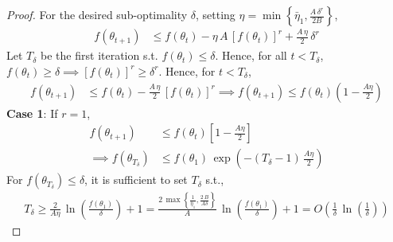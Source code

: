 \documentclass[10pt,a4paper]{amsart}
\newcommand{\tht}{\theta_t}
\newcommand{\thtt}{\theta_{t+1}}
\begin{document}
\begin{proof}
For the desired sub-optimality $\delta$, setting $\eta = \min\left\{\bar{\eta}_1, \frac{A \, \delta^{r}}{2B} \right\}$,
\begin{align*}
f(\thtt) & \leq f(\tht) - \eta \, A \, [f(\tht)]^r + \frac{A \, \eta}{2} \, \delta^r    
\end{align*}
Let $T_\delta$ be the first iteration s.t. $f(\tht) \leq \delta$. Hence, for all $t < T_\delta$, $f(\tht) \geq \delta \implies [f(\tht)]^{r} \geq \delta^r$. Hence, for $t < T_\delta$, 
\begin{align}
f(\thtt) & \leq f(\tht) - \frac{A \, \eta}{2} \,  [f(\tht)]^r \implies f(\thtt) \leq f(\tht)\left(1-\frac{A\eta}{2}\right)
\label{eq:lemma-p2-sd-inter-1}
\end{align}
\textbf{Case 1}: If $r = 1$, 
\begin{align*}
f(\thtt) & \leq f(\tht) \left[1 - \frac{A \eta}{2} \right] \\
\implies f(\theta_{T_\delta}) & \leq f(\theta_1) \, \exp\left(-(T_\delta-1) \, \frac{A \eta}{2}\right)
\end{align*}
For $f(\theta_{T_\delta}) \leq \delta$, it is sufficient to set $T_\delta$ s.t., 
\begin{align*}    
T_\delta \geq \frac{2}{A \eta} \, \ln\left(\frac{f(\theta_1)}{\delta}\right) + 1 = \frac{2 \, \max\left\{\frac{1}{\bar{\eta}_1}, \frac{2 \, B}{A \delta}\right\}}{A} \, \ln\left(\frac{f(\theta_1)}{\delta}\right) + 1 = O\left(\frac{1}{\delta} \, \ln\left(\frac{1}{\delta} \right)\right)
\end{align*}


\end{proof}
\end{document}
